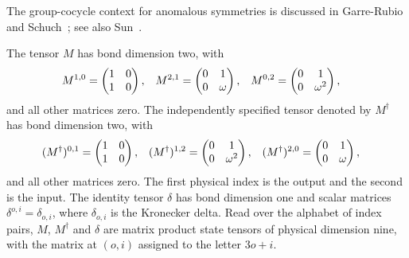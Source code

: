 The group-cocycle context for anomalous symmetries is discussed in
Garre-Rubio and Schuch~\cite{GarreRubioSchuch2024DomainWall}; see also
Sun~\cite{Sun2025Anomalous}.

\begin{definition}
    \label{def:asymex_z3anomalous_tensors}
    \leanok
    The tensor $M$ has bond dimension two, with
    \begin{align}
        M^{1,0} & =\begin{pmatrix}1&0\\1&0\end{pmatrix},        &
        M^{2,1} & =\begin{pmatrix}0&1\\0&\omega\end{pmatrix},   &
        M^{0,2} & =\begin{pmatrix}0&1\\0&\omega^2\end{pmatrix},
        \notag
    \end{align}
    and all other matrices zero. The independently specified tensor
    denoted by $M^\dagger$ has bond dimension two, with
    \begin{align}
        (M^\dagger)^{0,1} & =\begin{pmatrix}1&0\\1&0\end{pmatrix},        &
        (M^\dagger)^{1,2} & =\begin{pmatrix}0&1\\0&\omega^2\end{pmatrix}, &
        (M^\dagger)^{2,0} & =\begin{pmatrix}0&1\\0&\omega\end{pmatrix},
        \notag
    \end{align}
    and all other matrices zero. The first physical index is the output
    and the second is the input. The identity tensor $\delta$ has bond
    dimension one and scalar matrices $\delta^{o,i}=\delta_{o,i}$,
    where $\delta_{o,i}$ is the Kronecker delta.
    Read over the alphabet of index pairs, $M$, $M^\dagger$ and $\delta$
    are matrix product state tensors of physical dimension nine, with
    the matrix at $(o,i)$ assigned to the letter $3o+i$.


\end{definition}
